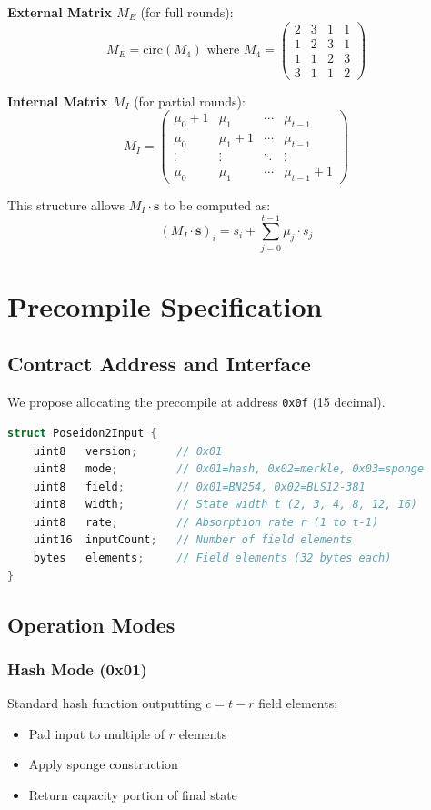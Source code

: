 \documentclass[11pt,a4paper]{article}
\begin{document}
\textbf{External Matrix $M_E$} (for full rounds):
\[
M_E = \text{circ}(M_4) \text{ where } M_4 = \begin{pmatrix} 2 & 3 & 1 & 1 \\ 1 & 2 & 3 & 1 \\ 1 & 1 & 2 & 3 \\ 3 & 1 & 1 & 2 \end{pmatrix}
\]

\textbf{Internal Matrix $M_I$} (for partial rounds):
\[
M_I = \begin{pmatrix} \mu_0 + 1 & \mu_1 & \cdots & \mu_{t-1} \\ \mu_0 & \mu_1 + 1 & \cdots & \mu_{t-1} \\ \vdots & \vdots & \ddots & \vdots \\ \mu_0 & \mu_1 & \cdots & \mu_{t-1} + 1 \end{pmatrix}
\]

This structure allows $M_I \cdot \mathbf{s}$ to be computed as:
\[
(M_I \cdot \mathbf{s})_i = s_i + \sum_{j=0}^{t-1} \mu_j \cdot s_j
\]

\section{Precompile Specification}

\subsection{Contract Address and Interface}

We propose allocating the precompile at address \texttt{0x0f} (15 decimal).

\begin{lstlisting}[language=C]
struct Poseidon2Input {
    uint8   version;      // 0x01
    uint8   mode;         // 0x01=hash, 0x02=merkle, 0x03=sponge
    uint8   field;        // 0x01=BN254, 0x02=BLS12-381
    uint8   width;        // State width t (2, 3, 4, 8, 12, 16)
    uint8   rate;         // Absorption rate r (1 to t-1)
    uint16  inputCount;   // Number of field elements
    bytes   elements;     // Field elements (32 bytes each)
}
\end{lstlisting}

\subsection{Operation Modes}

\subsubsection{Hash Mode (0x01)}
Standard hash function outputting $c = t - r$ field elements:
\begin{itemize}
    \item Pad input to multiple of $r$ elements
    \item Apply sponge construction
    \item Return capacity portion of final state
\end{itemize}
\end{document}
